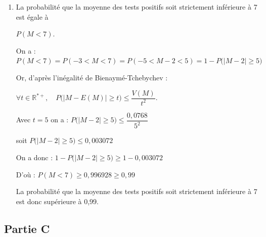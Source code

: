 \documentclass[10pt]{article}
\providecommand{\R}{\mathbb{R}}
\providecommand{\np}[2][]{{#2~#1}}
\begin{document}
\begin{enumerate}
\begin{enumerate}
		
		
	On a bien :  $\mathrm{E}(M)=2$ et  $\mathrm{V}(M)=\np{0,0768}$.
		
		\item La probabilité que la moyenne des tests positifs soit strictement inférieure à 7 est égale à 
		
		$P(M<7)$.
		
		On a  : $P(M<7) = P(-3<M<7)= P(-5< M-2<5) = 1- P\Big(\big|M-2\big| \geq 5\Big)$
		
		Or, d'après l'inégalité de Bienaymé-Tchebychev :
		
		$\forall t \in \R^{*+}, \quad P\Big(\big|M - E(M)\big| \geq t\Big) \leq  \dfrac{V(M)}{t^2 } $.
		
		Avec $t= 5$  on  a : $P\Big(\big|M- 2\big| \geq 5\Big) \leq  \dfrac{0,0768}{  5^2 } $
		
		soit  $ P\Big(\big|M-2\big| \geq 5 \Big) \leq 0,003072$
		
		On a donc :  $1- P\Big(\big|M-2\big| \geq 5 \Big) \geq 1- 0,003072$
		
		D'où : $P(M<7) \geq  0,996928 \geq 0,99$
		
		
	La probabilité que la moyenne des tests positifs soit strictement inférieure à 7 est donc  supérieure à 0,99.
		
	\end{enumerate}
\end{enumerate}

\subsection*{Partie C}
\end{document}
